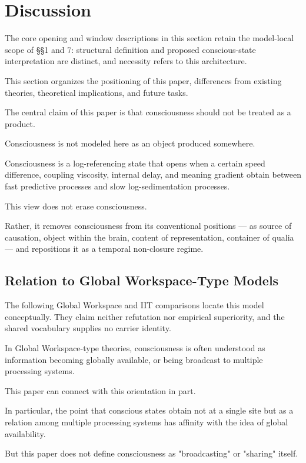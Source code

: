 \section{Discussion}

The core opening and window descriptions in this section retain the model-local scope of §§1 and 7: structural definition and proposed conscious-state interpretation are distinct, and necessity refers to this architecture.


This section organizes the positioning of this paper, differences from existing theories, theoretical implications, and future tasks.

The central claim of this paper is that consciousness should not be treated as a product.

Consciousness is not modeled here as an object produced somewhere.

Consciousness is a log-referencing state that opens when a certain speed difference, coupling viscosity, internal delay, and meaning gradient obtain between fast predictive processes and slow log-sedimentation processes.

This view does not erase consciousness.

Rather, it removes consciousness from its conventional positions — as source of causation, object within the brain, content of representation, container of qualia — and repositions it as a temporal non-closure regime.

\subsection{Relation to Global Workspace-Type Models}

The following Global Workspace and IIT comparisons locate this model conceptually. They claim neither refutation nor empirical superiority, and the shared vocabulary supplies no carrier identity.


In Global Workspace-type theories, consciousness is often understood as information becoming globally available, or being broadcast to multiple processing systems.

This paper can connect with this orientation in part.

In particular, the point that conscious states obtain not at a single site but as a relation among multiple processing systems has affinity with the idea of global availability.

But this paper does not define consciousness as "broadcasting" or "sharing" itself.

